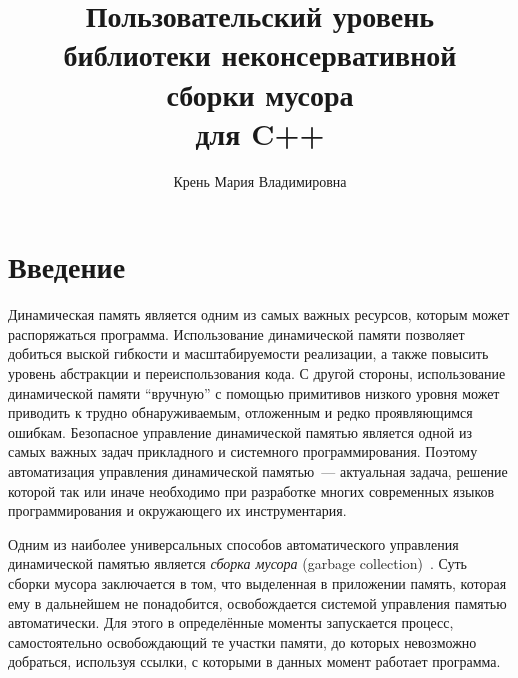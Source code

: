 
\title{Пользовательский уровень\\
библиотеки неконсервативной\\ 
сборки мусора\\
для C++}
%
\author{Крень Мария Владимировна}
%
%
%

\maketitle              %

\section*{Введение}

Динамическая память является одним из самых важных ресурсов, которым может распоряжаться программа. Использование
динамической памяти позволяет добиться выской гибкости и масштабируемости реализации, а также повысить уровень
абстракции и переиспользования кода. С другой стороны, использование динамической памяти ``вручную'' с помощью
примитивов низкого уровня может приводить к трудно обнаруживаемым, отложенным и редко проявляющимся ошибкам. 
Безопасное управление динамической памятью является одной из самых важных задач прикладного и системного программирования. 
Поэтому автоматизация управления динамической памятью~--- актуальная задача, решение которой так или иначе необходимо при
разработке многих современных языков программирования и окружающего их инструментария.

Одним из наиболее универсальных способов автоматического управления динамической памятью является \emph{сборка мусора} 
(garbage collection)~\cite{GCBook}. Суть сборки мусора заключается в том, что выделенная в приложении память, 
которая ему в дальнейшем не понадобится, освобождается системой управления памятью автоматически. Для этого в 
определённые моменты запускается процесс, самостоятельно освобождающий те участки памяти, до которых невозможно
добраться, используя ссылки, с которыми в данных момент работает программа.
 
